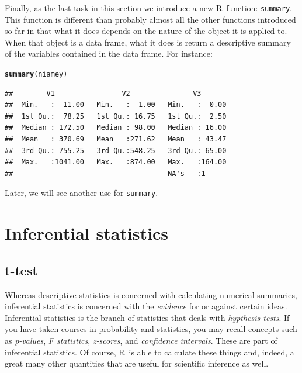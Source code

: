 \documentclass{article}\usepackage[]{graphicx}\usepackage[]{color}
\makeatletter
\newcommand{\hlstd}[1]{\textcolor[rgb]{0.345,0.345,0.345}{#1}}%
\newcommand{\hlkwd}[1]{\textcolor[rgb]{0.737,0.353,0.396}{\textbf{#1}}}%
\newenvironment{kframe}{%
 \def\at@end@of@kframe{}%
 \ifinner\ifhmode%
  \def\at@end@of@kframe{\end{minipage}}%
  \begin{minipage}{\columnwidth}%
 \fi\fi%
 \def\FrameCommand##1{\hskip\@totalleftmargin \hskip-\fboxsep
 \colorbox{shadecolor}{##1}\hskip-\fboxsep
     \hskip-\linewidth \hskip-\@totalleftmargin \hskip\columnwidth}%
 \MakeFramed {\advance\hsize-\width
   \@totalleftmargin\z@ \linewidth\hsize
   \@setminipage}}%
 {\par\unskip\endMakeFramed%
 \at@end@of@kframe}
\newenvironment{knitrout}{}{} %
\newcommand{\R}{\textsf{R}}
\newcommand{\code}[1]{\texttt{#1}}
\theoremstyle{exercise}
\makeatother
\begin{document}
Finally, as the last task in this section we introduce a new \R\ function: \code{summary}. This function is different than probably almost all the other functions introduced so far in that what it does depends on the nature of the object it is applied to. When that object is a data frame, what it does is return a descriptive summary of the variables contained in the data frame. For instance:

\begin{knitrout}
\color{fgcolor}\begin{kframe}
\begin{alltt}
\hlkwd{summary}\hlstd{(niamey)}
\end{alltt}
\begin{verbatim}
##        V1                V2               V3        
##  Min.   :  11.00   Min.   :  1.00   Min.   :  0.00  
##  1st Qu.:  78.25   1st Qu.: 16.75   1st Qu.:  2.50  
##  Median : 172.50   Median : 98.00   Median : 16.00  
##  Mean   : 370.69   Mean   :271.62   Mean   : 43.47  
##  3rd Qu.: 755.25   3rd Qu.:548.25   3rd Qu.: 65.00  
##  Max.   :1041.00   Max.   :874.00   Max.   :164.00  
##                                     NA's   :1
\end{verbatim}
\end{kframe}
\end{knitrout}

Later, we will see another use for \code{summary}.

\section{Inferential statistics}

\subsection{t-test}

Whereas descriptive statistics is concerned with calculating numerical summaries, inferential statistics is concerned with the \textit{evidence} for or against certain ideas. Inferential statistics is the branch of statistics that deals with \textit{hypthesis tests}. If you have taken courses in probability and statistics, you may recall concepts such as \textit{p-values}, \textit{F statistics}, \textit{z-scores}, and \textit{confidence intervals}. These are part of inferential statistics. Of course, \R\ is able to calculate these things and, indeed, a great many other quantities that are useful for scientific inference as well.
\end{document}
